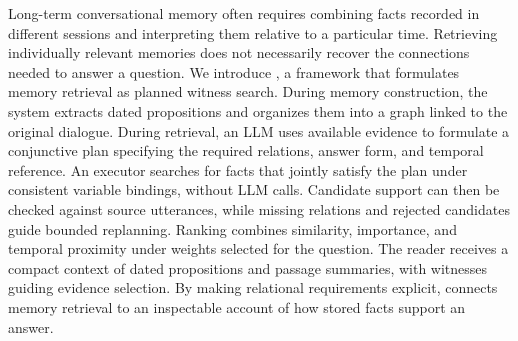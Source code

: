 Long-term conversational memory often requires combining facts recorded
in different sessions and interpreting them relative to a particular
time. Retrieving individually relevant memories does not necessarily
recover the connections needed to answer a question. We introduce
\sys, a framework that formulates memory retrieval as planned witness
search. During memory construction, the system extracts dated
propositions and organizes them into a graph linked to the original
dialogue. During retrieval, an \ac{LLM} uses available evidence to
formulate a conjunctive plan specifying the required relations,
answer form, and temporal reference. An executor searches for facts
that jointly satisfy the plan under consistent variable bindings,
without \ac{LLM} calls. Candidate support can then be checked against
source utterances, while missing relations and rejected candidates
guide bounded replanning. Ranking combines similarity, importance,
and temporal proximity under weights selected for the question.
The reader receives a compact context of dated propositions and
passage summaries, with witnesses guiding evidence selection.
By making relational requirements explicit, \sys connects memory
retrieval to an inspectable account of how stored facts support
an answer.
